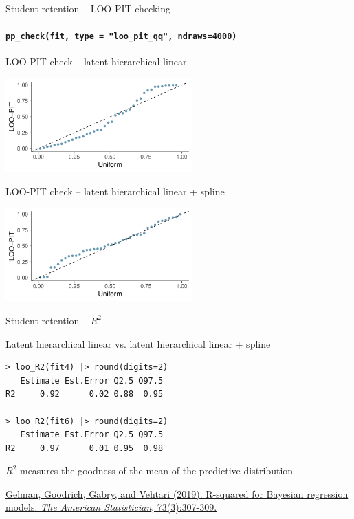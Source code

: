 \documentclass[english,t]{beamer}
\begin{document}
\begin{frame}[fragile]{Student retention -- LOO-PIT checking}
\framesubtitle{\texttt{pp\_check(fit, type = "loo\_pit\_qq", ndraws=4000)}}

\vspace{-0.5\baselineskip}  
LOO-PIT check -- latent hierarchical linear\\  
  \hspace{-7mm}
  \begin{minipage}[t][3.6cm][t]{1.0\linewidth}
    \includegraphics[height=3.6cm]{student_retention_lbinom_ppc_loo_pit_qq.pdf}
  \end{minipage}  

\vspace{-0.5\baselineskip}  
LOO-PIT check -- latent hierarchical linear + spline\\  
  \hspace{-7mm}
  \begin{minipage}[t][3.6cm][t]{1.0\linewidth}
    \includegraphics[height=3.6cm]{student_retention_sbinom_ppc_loo_pit_qq.pdf}
  \end{minipage}  

\end{frame}

\begin{frame}[fragile]{Student retention -- $R^2$}

Latent hierarchical linear vs. latent hierarchical linear + spline
  
\begin{verbatim}
> loo_R2(fit4) |> round(digits=2)
   Estimate Est.Error Q2.5 Q97.5
R2     0.92      0.02 0.88  0.95

> loo_R2(fit6) |> round(digits=2)
   Estimate Est.Error Q2.5 Q97.5
R2     0.97      0.01 0.95  0.98
\end{verbatim}

  $R^2$ measures the goodness of the mean of the predictive
  distribution

  \vspace{4\baselineskip}
{\color{gray}\footnotesize \href{https://doi.org/10.1080/00031305.2018.1549100}{Gelman, Goodrich, Gabry, and Vehtari (2019). R-squared for Bayesian regression models. \textit{The American Statistician}, 73(3):307-309.}}
  
\end{frame}
\end{document}
